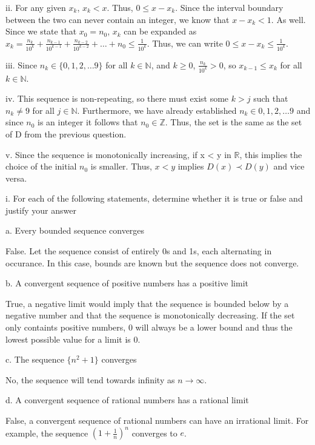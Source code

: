 \documentclass[addpoints]{exam}
\begin{document}
\begin{questions}
ii. For any given $x_k$, $x_k < x$. Thus, $0 \leq x - x_k$. Since the interval boundary between the two can 
never contain an integer, we know that $x - x_k < 1$. As well. Since we state that $x_0 = n_0$,
$x_k$ can be expanded as $x_k = \frac{n_k}{10^k} + \frac{n_{k- 1}}{10^{k - 1}} + \frac{n_{k- 2}}{10^{k - 2}} + \dots + n_0 \leq \frac{1}{10^k}$.
Thus, we can write $0 \leq x - x_k \leq \frac{1}{10^k}$.

iii. Since $n_k \in \{0, 1, 2, \dots 9\}$ for all $k \in \mathbb{N}$, 
and $k \geq 0$, $\frac{n_k}{10^k} > 0$, so $x_{k-1} \leq x_k$ for all $k \in \mathbb{N}$.

iv. This sequence is non-repeating, so there must exist some $k > j$ such that $n_k \neq 9$ for all 
$j \in \mathbb{N}$. Furthermore, we have already established $n_k \in {0, 1, 2, \dots 9}$ and since 
$n_0$ is an integer it follows that $n_0 \in \mathbb{Z}$. Thus, the set is the same as the set of D
from the previous question.

v. Since the sequence is monotonically increasing, if x < y in $\mathbb{R}$, this implies the 
choice of the initial $n_0$ is smaller. Thus, $x < y$ implies $D(x) \prec D(y)$ and vice versa.

\question 

i. For each of the following statements, determine whether it is true or false and justify your answer

a. Every bounded sequence converges

False. Let the sequence consist of entirely 0s and 1s, each alternating in occurance. In this case, 
bounds are known but the sequence does not converge.

b. A convergent sequence of positive numbers has a positive limit

True, a negative limit would imply that the sequence is bounded below by a negative number and that 
the sequence is monotonically decreasing. If the set only containts positive numbers, 0 will always 
be a lower bound and thus the lowest possible value for a limit is 0. 

c. The sequence $\{n^2 + 1\}$ converges

No, the sequence will tend towards infinity as $n \to \infty$.

d. A convergent sequence of rational numbers has a rational limit

False, a convergent sequence of rational numbers can have an irrational limit. For example, the sequence
$(1 + \frac{1}{n})^n$ converges to $e$.


\end{questions}
\end{document}
